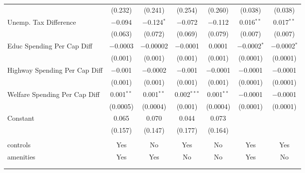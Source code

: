 \begin{table}[!htbp]
\begin{tabular}{@{\extracolsep{5pt}}lcccccc}
  & (0.232) & (0.241) & (0.254) & (0.260) & (0.038) & (0.038) \\ 
  Unemp. Tax Difference & $-$0.094 & $-$0.124$^{*}$ & $-$0.072 & $-$0.112 & 0.016$^{**}$ & 0.017$^{**}$ \\ 
  & (0.063) & (0.072) & (0.069) & (0.079) & (0.007) & (0.007) \\ 
  Educ Spending Per Cap Diff & $-$0.0003 & $-$0.00002 & $-$0.0001 & 0.0001 & $-$0.0002$^{*}$ & $-$0.0002$^{*}$ \\ 
  & (0.001) & (0.001) & (0.001) & (0.001) & (0.0001) & (0.0001) \\ 
  Highway Spending Per Cap Diff & $-$0.001 & $-$0.0002 & $-$0.001 & $-$0.0001 & $-$0.0001 & $-$0.0001 \\ 
  & (0.001) & (0.001) & (0.001) & (0.001) & (0.0001) & (0.0001) \\ 
  Welfare Spending Per Cap Diff & 0.001$^{**}$ & 0.001$^{**}$ & 0.002$^{***}$ & 0.001$^{**}$ & $-$0.0001 & $-$0.0001 \\ 
  & (0.0005) & (0.0004) & (0.001) & (0.0004) & (0.0001) & (0.0001) \\ 
  Constant & 0.065 & 0.070 & 0.044 & 0.073 &  &  \\ 
  & (0.157) & (0.147) & (0.177) & (0.164) &  &  \\ 
 \hline \\[-1.8ex] 
controls & Yes & No & Yes & No & Yes & Yes \\ 
amenities & Yes & Yes & No & No & Yes & No \\ 
\hline \\[-1.8ex] 
\hline 
\hline \\[-1.8ex] 
\end{tabular} 
\end{table} 
